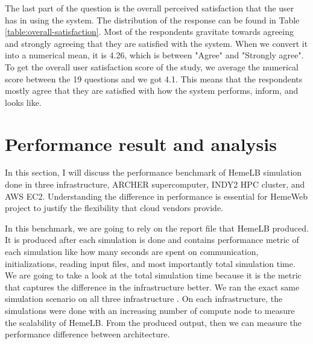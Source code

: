 The last part of the question is the overall perceived satisfaction that the user has in using the system. The distribution of the response can be found in Table \ref{table:overall-satisfaction}. Most of the respondents gravitate towards agreeing and strongly agreeing that they are satisfied with the system. When we convert it into a numerical mean, it is 4.26, which is between "Agree" and "Strongly agree". To get the overall user satisfaction score of the study, we average the numerical score between the 19 questions and we got 4.1. This means that the respondents mostly agree that they are satisfied with how the system performs,  inform, and looks like.

\section{Performance result and analysis}

In this section, I will discuss the performance benchmark of HemeLB simulation done in three infrastructure, ARCHER supercomputer, INDY2 HPC cluster, and AWS EC2. Understanding the difference in performance is essential for HemeWeb project to justify the flexibility that cloud vendors provide.

In this benchmark, we are going to rely on the report file that HemeLB produced. It is produced after each simulation is done and contains performance metric of each simulation like how many seconds are spent on communication, initializations, reading input files, and most importantly total simulation time. We are going to take a look at the total simulation time because it is the metric that captures the difference in the infrastructure better. We ran the exact same simulation scenario on all three infrastructure . On each infrastructure, the simulations were done with an increasing number of compute node to measure the scalability of HemeLB.  From the produced output, then we can measure the performance difference between architecture.





